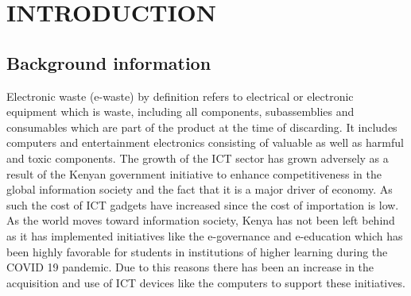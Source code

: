 \documentclass{article}
\begin{document}
\thispagestyle{empty}
\cleardoublepage




\setcounter{page}{1}
\newpage
\section{ INTRODUCTION}
\subsection{Background information}
Electronic waste (e-waste) by definition refers to electrical or electronic equipment which is waste, including all components, subassemblies and consumables which are part of the product at the time of discarding. It includes computers and entertainment electronics consisting of valuable as well as harmful and toxic components\cite{khutaleelectronic}. The growth of the ICT sector has grown adversely as a result of the Kenyan government initiative to enhance competitiveness in the global information society and the fact that it is a major driver of economy. As such the cost of ICT gadgets have increased since the cost of importation is low. As the world moves toward information society, Kenya has not been left behind as it has implemented initiatives like the e-governance and e-education\cite{ouma2013learning} which has been highly favorable for students in institutions of higher learning during the COVID 19 pandemic. Due to this reasons there has been an increase in the acquisition and use of ICT devices like the computers to support these initiatives.
\end{document}
